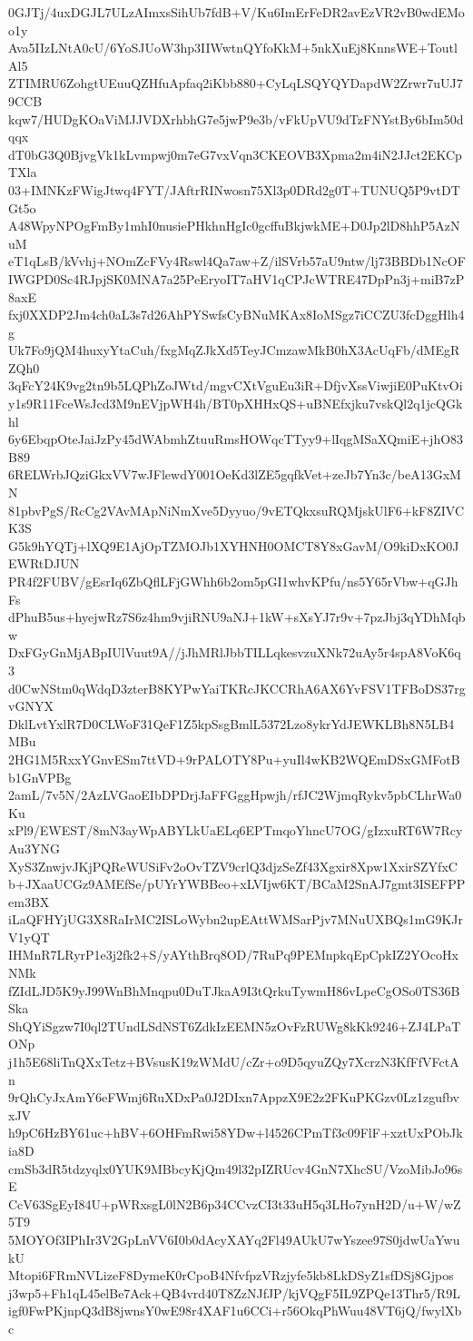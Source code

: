 0GJTj/4uxDGJL7ULzAImxsSihUb7fdB+V/Ku6ImErFeDR2avEzVR2vB0wdEMoo1y
Ava5IIzLNtA0cU/6YoSJUoW3hp3IIWwtnQYfoKkM+5nkXuEj8KnnsWE+ToutlAl5
ZTIMRU6ZohgtUEuuQZHfuApfaq2iKbb880+CyLqLSQYQYDapdW2Zrwr7uUJ79CCB
kqw7/HUDgKOaViMJJVDXrhbhG7e5jwP9e3b/vFkUpVU9dTzFNYstBy6bIm50dqqx
dT0bG3Q0BjvgVk1kLvmpwj0m7eG7vxVqn3CKEOVB3Xpma2m4iN2JJct2EKCpTXla
03+IMNKzFWigJtwq4FYT/JAftrRINwosn75Xl3p0DRd2g0T+TUNUQ5P9vtDTGt5o
A48WpyNPOgFmBy1mhI0nusiePHkhnHgIc0gcffuBkjwkME+D0Jp2lD8hhP5AzNuM
eT1qLsB/kVvhj+NOmZcFVy4Rswl4Qa7aw+Z/ilSVrb57aU9ntw/lj73BBDb1NcOF
IWGPD0Sc4RJpjSK0MNA7a25PeEryoIT7aHV1qCPJcWTRE47DpPn3j+miB7zP8axE
fxj0XXDP2Jm4ch0aL3s7d26AhPYSwfsCyBNuMKAx8IoMSgz7iCCZU3fcDggHlh4g
Uk7Fo9jQM4huxyYtaCuh/fxgMqZJkXd5TeyJCmzawMkB0hX3AcUqFb/dMEgRZQh0
3qFcY24K9vg2tn9b5LQPhZoJWtd/mgvCXtVguEu3iR+DfjvXssViwjiE0PuKtvOi
y1s9R11FceWsJcd3M9nEVjpWH4h/BT0pXHHxQS+uBNEfxjku7vskQl2q1jcQGkhl
6y6EbqpOteJaiJzPy45dWAbmhZtuuRmsHOWqcTTyy9+lIqgMSaXQmiE+jhO83B89
6RELWrbJQziGkxVV7wJFlewdY001OeKd3lZE5gqfkVet+zeJb7Yn3c/beA13GxMN
81pbvPgS/RcCg2VAvMApNiNmXve5Dyyuo/9vETQkxsuRQMjskUlF6+kF8ZIVCK3S
G5k9hYQTj+lXQ9E1AjOpTZMOJb1XYHNH0OMCT8Y8xGavM/O9kiDxKO0JEWRtDJUN
PR4f2FUBV/gEsrIq6ZbQflLFjGWhh6b2om5pGI1whvKPfu/ns5Y65rVbw+qGJhFs
dPhuB5us+hyejwRz7S6z4hm9vjiRNU9aNJ+1kW+sXsYJ7r9v+7pzJbj3qYDhMqbw
DxFGyGnMjABpIUlVuut9A//jJhMRlJbbTILLqkesvzuXNk72uAy5r4spA8VoK6q3
d0CwNStm0qWdqD3zterB8KYPwYaiTKRcJKCCRhA6AX6YvFSV1TFBoDS37rgvGNYX
DklLvtYxlR7D0CLWoF31QeF1Z5kpSsgBmlL5372Lzo8ykrYdJEWKLBh8N5LB4MBu
2HG1M5RxxYGnvESm7ttVD+9rPALOTY8Pu+yuIl4wKB2WQEmDSxGMFotBb1GnVPBg
2amL/7v5N/2AzLVGaoEIbDPDrjJaFFGggHpwjh/rfJC2WjmqRykv5pbCLhrWa0Ku
xPl9/EWEST/8mN3ayWpABYLkUaELq6EPTmqoYhncU7OG/gIzxuRT6W7RcyAu3YNG
XyS3ZnwjvJKjPQReWUSiFv2oOvTZV9crlQ3djzSeZf43Xgxir8Xpw1XxirSZYfxC
b+JXaaUCGz9AMEfSe/pUYrYWBBeo+xLVIjw6KT/BCaM2SnAJ7gmt3ISEFPPem3BX
iLaQFHYjUG3X8RaIrMC2ISLoWybn2upEAttWMSarPjv7MNuUXBQs1mG9KJrV1yQT
IHMnR7LRyrP1e3j2fk2+S/yAYthBrq8OD/7RuPq9PEMnpkqEpCpkIZ2YOcoHxNMk
fZIdLJD5K9yJ99WnBhMnqpu0DuTJkaA9I3tQrkuTywmH86vLpeCgOSo0TS36BSka
ShQYiSgzw7I0ql2TUndLSdNST6ZdkIzEEMN5zOvFzRUWg8kKk9246+ZJ4LPaTONp
j1h5E68liTnQXxTetz+BVsusK19zWMdU/cZr+o9D5qyuZQy7XcrzN3KfFfVFctAn
9rQhCyJxAmY6eFWmj6RuXDxPa0J2DIxn7AppzX9E2z2FKuPKGzv0Lz1zgufbvxJV
h9pC6HzBY61uc+hBV+6OHFmRwi58YDw+l4526CPmTf3c09FlF+xztUxPObJkia8D
cmSb3dR5tdzyqlx0YUK9MBbcyKjQm49l32pIZRUcv4GnN7XhcSU/VzoMibJo96sE
CcV63SgEyI84U+pWRxsgL0lN2B6p34CCvzCI3t33uH5q3LHo7ynH2D/u+W/wZ5T9
5MOYOf3IPhIr3V2GpLnVV6I0b0dAcyXAYq2Fl49AUkU7wYszee97S0jdwUaYwukU
Mtopi6FRmNVLizeF8DymeK0rCpoB4NfvfpzVRzjyfe5kb8LkDSyZ1sfDSj8Gjpos
j3wp5+Fh1qL45elBe7Ack+QB4vrd40T8ZzNJfJP/kjVQgF5IL9ZPQe13Thr5/R9L
igf0FwPKjnpQ3dB8jwnsY0wE98r4XAF1u6CCi+r56OkqPhWuu48VT6jQ/fwylXbc
